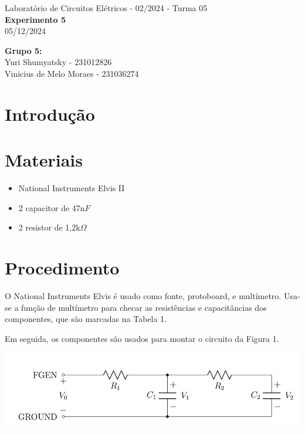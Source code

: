 \documentclass[a4 paper]{article}
\newcommand{\parag}{\hspace{30pt}}
\begin{document}
\justifying
\begin{center}{\large Laboratório de Circuitos Elétricos - 02/2024 - Turma 05}\\
{\large \textbf{Experimento 5}}\\ 
05/12/2024
\end{center}

\vspace{500pt}
 \noindent\textbf{Grupo 5:}\\
 Yuri Shumyatsky - 231012826\\
Vinicius de Melo Moraes - 231036274\\



\vspace{30pt}
\newpage

\section{Introdução}

\section{Materiais}


	\begin{itemize}
	\item National Instruments Elvis II
	\item 2 capacitor de 47n$F$
	\item 2 resistor de 1,2k$\Omega$
	
	\end{itemize}

\newpage

\section{Procedimento}

\parag O National Instruments Elvis é usado como fonte, protoboard, e multímetro. Usa-se a função de multímetro para checar as resistências e capacitâncias dos componentes, que são marcadas na Tabela 1.



Em seguida, os componentes são usados para montar o circuito da Figura 1.

\begin{table}[h]
\centering
\includegraphics[scale=0.7]{figuras/figura1}
\end{table}
\end{document}
